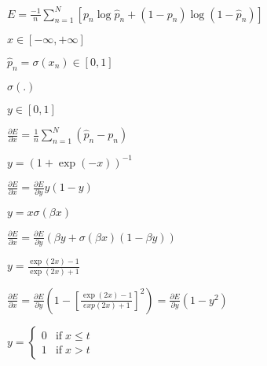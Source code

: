 \documentclass{article}
\begin{document}
$ E = \frac{-1}{n} \sum\limits_{n=1}^N \left[ p_n \log \hat{p}_n + (1 - p_n) \log(1 - \hat{p}_n) \right] $
\pagebreak

$ x \in [-\infty, +\infty]$
\pagebreak

$ \hat{p}_n = \sigma(x_n) \in [0, 1] $
\pagebreak

$ \sigma(.) $
\pagebreak

$ y \in [0, 1] $
\pagebreak

$ \frac{\partial E}{\partial x} = \frac{1}{n} \sum\limits_{n=1}^N (\hat{p}_n - p_n) $
\pagebreak

$ y = (1 + \exp(-x))^{-1} $
\pagebreak

$ \frac{\partial E}{\partial x} = \frac{\partial E}{\partial y} y (1 - y) $
\pagebreak

$ y = x \sigma (\beta x) $
\pagebreak

$ \frac{\partial E}{\partial x} = \frac{\partial E}{\partial y}(\beta y + \sigma (\beta x)(1 - \beta y)) $
\pagebreak

$ y = \frac{\exp(2x) - 1}{\exp(2x) + 1} $
\pagebreak

$ \frac{\partial E}{\partial x} = \frac{\partial E}{\partial y} \left(1 - \left[\frac{\exp(2x) - 1}{exp(2x) + 1} \right]^2 \right) = \frac{\partial E}{\partial y} (1 - y^2) $
\pagebreak

$ y = \left\{ \begin{array}{lr} 0 & \mathrm{if} \; x \le t \\ 1 & \mathrm{if} \; x > t \end{array} \right. $
\pagebreak
\end{document}
